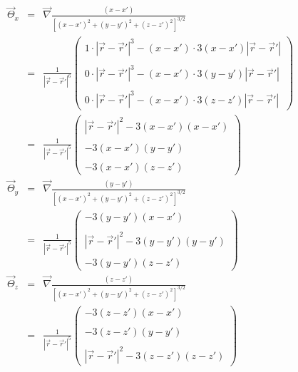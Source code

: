 \begin{eqnarray}
\vec\Theta_x 
&=& \vec\nabla \frac{ (x-x')}{ [(x-x')^2+(y-y')^2+(z-z')^2]^{3/2}   } \\
&=&
\frac{1}{|{\vec r}-{\vec r}'|^6}
\left(\begin{array}{c}
1 \cdot |{\vec r}-{\vec r}'|^3 - (x-x') \cdot 3 (x-x') |{\vec r}-{\vec r}'| \\ \\
0 \cdot |{\vec r}-{\vec r}'|^3 - (x-x') \cdot 3 (y-y') |{\vec r}-{\vec r}'| \\ \\
0 \cdot |{\vec r}-{\vec r}'|^3 - (x-x') \cdot 3 (z-z') |{\vec r}-{\vec r}'| 
\end{array}\right) \\
&=& 
\frac{1}{|{\vec r}-{\vec r}'|^5}
\left(\begin{array}{c}
|{\vec r}-{\vec r}'|^2 - 3(x-x') (x-x')  \\ \\
- 3(x-x')(y-y')  \\ \\
- 3(x-x')(z-z')  
\end{array}\right) \\ 
\vec\Theta_y 
&=& \vec\nabla \frac{ (y-y')}{ [(x-x')^2+(y-y')^2+(z-z')^2]^{3/2}   } \\
&=& 
\frac{1}{|{\vec r}-{\vec r}'|^5}
\left(\begin{array}{c}
- 3(y-y') (x-x')  \\ \\
|{\vec r}-{\vec r}'|^2 - 3(y-y')(y-y')  \\ \\
- 3(y-y')(z-z')  
\end{array}\right) \\ 
\vec\Theta_z 
&=& \vec\nabla \frac{ (z-z')}{ [(x-x')^2+(y-y')^2+(z-z')^2]^{3/2}   } \\
&=& 
\frac{1}{|{\vec r}-{\vec r}'|^5}
\left(\begin{array}{c}
- 3(z-z') (x-x')  \\ \\
- 3(z-z')(y-y')  \\ \\
|{\vec r}-{\vec r}'|^2 - 3(z-z')(z-z')  
\end{array}\right) \\ 
\end{eqnarray}


